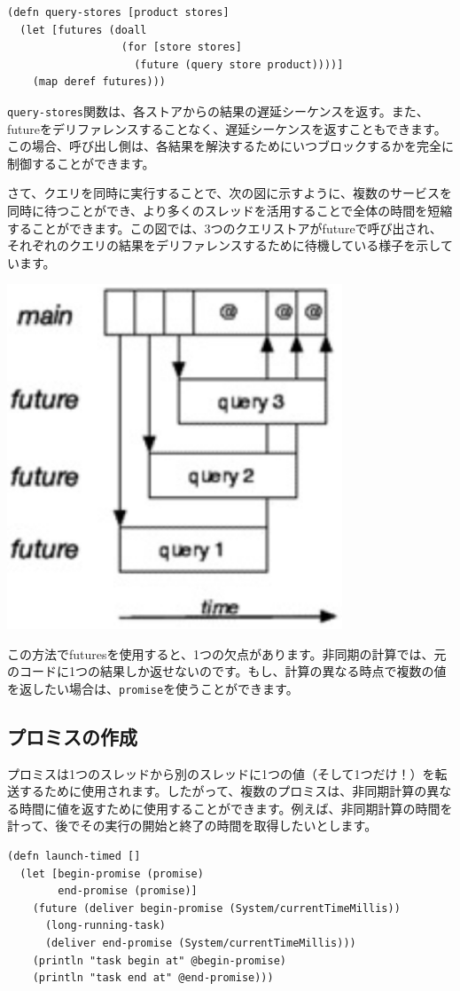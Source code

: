 \begin{lstlisting}[numbers=none]
(defn query-stores [product stores]
  (let [futures (doall
                  (for [store stores]
                    (future (query store product))))]
    (map deref futures)))
\end{lstlisting}

\texttt{query-stores}関数は、各ストアからの結果の遅延シーケンスを返す。また、futureをデリファレンスすることなく、遅延シーケンスを返すこともできます。この場合、呼び出し側は、各結果を解決するためにいつブロックするかを完全に制御することができます。

さて、クエリを同時に実行することで、次の図に示すように、複数のサービスを同時に待つことができ、より多くのスレッドを活用することで全体の時間を短縮することができます。この図では、3つのクエリストアがfutureで呼び出され、それぞれのクエリの結果をデリファレンスするために待機している様子を示しています。

\includegraphics[width=10cm]{fig_05_004.eps}

この方法でfuturesを使用すると、1つの欠点があります。非同期の計算では、元のコードに1つの結果しか返せないのです。もし、計算の異なる時点で複数の値を返したい場合は、\texttt{promise}を使うことができます。

\subsection{プロミスの作成}

プロミスは1つのスレッドから別のスレッドに1つの値（そして1つだけ！）を転送するために使用されます。したがって、複数のプロミスは、非同期計算の異なる時間に値を返すために使用することができます。例えば、非同期計算の時間を計って、後でその実行の開始と終了の時間を取得したいとします。


\begin{lstlisting}[numbers=none]
(defn launch-timed []
  (let [begin-promise (promise)
        end-promise (promise)]
    (future (deliver begin-promise (System/currentTimeMillis))
      (long-running-task)
      (deliver end-promise (System/currentTimeMillis)))
    (println "task begin at" @begin-promise)
    (println "task end at" @end-promise)))
\end{lstlisting}

